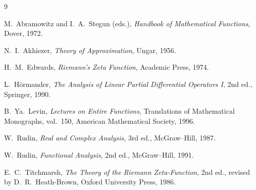 \documentclass[11pt]{article}
\begin{document}
\begin{thebibliography}{9}

M.~Abramowitz and I.~A.~Stegun (eds.), \emph{Handbook of Mathematical Functions}, Dover, 1972.

N.~I.~Akhiezer, \emph{Theory of Approximation}, Ungar, 1956.

H.~M.~Edwards, \emph{Riemann's Zeta Function}, Academic Press, 1974.

L.~H\"ormander, \emph{The Analysis of Linear Partial Differential Operators I}, 2nd ed., Springer, 1990.

B.~Ya.~Levin, \emph{Lectures on Entire Functions}, Translations of Mathematical Monographs, vol.~150, American Mathematical Society, 1996.

W.~Rudin, \emph{Real and Complex Analysis}, 3rd ed., McGraw--Hill, 1987.

W.~Rudin, \emph{Functional Analysis}, 2nd ed., McGraw--Hill, 1991.

E.~C.~Titchmarsh, \emph{The Theory of the Riemann Zeta-Function}, 2nd ed., revised by D.~R.~Heath-Brown, Oxford University Press, 1986.

\end{thebibliography}
\end{document}
